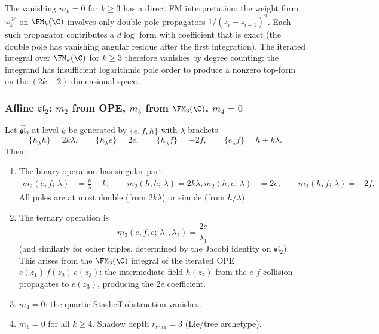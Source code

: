 \begin{remark}
The vanishing $m_k = 0$ for $k \ge 3$ has a direct FM
interpretation: the weight form
$\omega_k^{\mathcal{H}}$ on $\FM_k(\C)$ involves
only double-pole propagators $1/(z_i - z_{i+1})^2$.
Each such propagator contributes a $d\log$ form with
coefficient that is exact (the double pole has vanishing
angular residue after the first integration). The
iterated integral over $\FM_k(\C)$ for $k \ge 3$
therefore vanishes by degree counting: the integrand
has insufficient logarithmic pole order to produce a
nonzero top-form on the $(2k-2)$-dimensional space.
\end{remark}


\subsubsection{Affine $\mathfrak{sl}_2$: $m_2$ from OPE,
$m_3$ from $\FM_3(\C)$, $m_4 = 0$}

\begin{theorem}
Let $\hat{\mathfrak{sl}}_2$ at level $k$ be generated by
$\{e, f, h\}$ with $\lambda$-brackets
\begin{equation}%
\{h{}_\lambda h\} = 2k\lambda,
\qquad
\{h{}_\lambda e\} = 2e,
\qquad
\{h{}_\lambda f\} = -2f,
\qquad
\{e{}_\lambda f\} = h + k\lambda.
\end{equation}
Then:
\begin{enumerate}[label=\textup{(\roman*)}]
\item The binary operation has singular part
\begin{align}
m_2(e, f;\, \lambda) &= \frac{h}{\lambda} + k,
\qquad
m_2(h, h;\, \lambda) = 2k\lambda,
m_2(h, e;\, \lambda) &= 2e,
\qquad
m_2(h, f;\, \lambda) = -2f.
\end{align}
All poles are at most double (from $2k\lambda$) or
simple (from $h/\lambda$).
\item The ternary operation is
\begin{equation}%
m_3(e, f, e;\, \lambda_1, \lambda_2)
= \frac{2e}{\lambda_1}
\end{equation}
(and similarly for other triples, determined by the
Jacobi identity on $\mathfrak{sl}_2$). This arises from
the $\FM_3(\C)$ integral of the iterated OPE
$e(z_1)\, f(z_2)\, e(z_3)$: the intermediate field
$h(z_2)$ from the $e$-$f$ collision propagates to
$e(z_3)$, producing the $2e$ coefficient.
\item $m_4 = 0$: the quartic Stasheff obstruction
vanishes.
\item $m_k = 0$ for all $k \ge 4$. Shadow depth
$r_{\max} = 3$ (Lie/tree archetype).
\end{enumerate}
\end{theorem}

